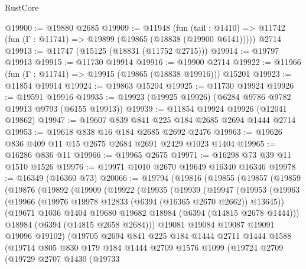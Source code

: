 \begin{lexlean}{RustCore}
\begin{coremodule}
@19900 := @19880 @2685
@19909 := @11948
    (fun (tail : @1410) => @11742 (fun (Γ : @11741) => @19899 (@19865 (@18838 (@19900 @6141)))))
    @2714
@19913 := @11747 (@15125 (@18831 (@11752 @2715)))
@19914 := @19797 @19913
@19915 := @11730 @19914
@19916 := @19900 @2714
@19922 := @11966 (fun (Γ : @11741) => @19915 (@19865 (@18838 @19916))) @15201
@19923 := @11854 @19914
@19924 := @19863 @15204
@19925 := @11730 @19924
@19926 := @19591 @19916
@19935 := @19923 (@19925 @19926) (@6284 @9786 @9782 @19913 @9793 (@6155 @19913))
@19939 := @11854 @19924 @19926 (@12041 @19862)
@19947 := @19607 @839 @841 @225 @184 @2685 @2694 @1444 @2714
@19953 := @19618 @838 @16 @184 @2685 @2692 @2476
@19963 := @19626 @836 @409 @11 @15 @2675 @2684 @2691 @2429 @1023 @1404
@19965 := @16286 @836 @11
@19966 := @19965 @2675
@19971 := @16298 @73 @39 @11 @1510 @1526
@19976 := @19971 @1010 @2670 @19649 @16340 @16346
@19978 := @16349 (@16360 @73)
@20066 := @19794
    (@19816
      (@19855
        (@19857
          (@19859
            (@19876
              (@19892
                (@19909
                  (@19922
                    (@19935
                      (@19939
                        (@19947
                          (@19953
                            (@19963
                              (@19966 (@19976 @19978 @12833 (@6394 (@16365 @2670 @2662)) @13645))
                              (@19671 @1036 @1404 @19680 @19682 @18984 (@6394 (@14815 @2678 @1444)))
                              @18984
                              (@6394 (@14815 @2658 @2684)))
                            @19081
                            @19084
                            @19087
                            @19091
                            @19096
                            @19102)
                          (@19705
                            @2694
                            @841
                            @225
                            @184
                            @1444
                            @2711
                            @1444
                            @1588
                            (@19714
                              @805
                              @830
                              @179
                              @184
                              @1444
                              @2709
                              @1576
                              @1099
                              (@19724
                                @2709
                                (@19729
                                  @2707
                                  @1430
                                  (@19733

\end{coremodule}
\end{lexlean}

